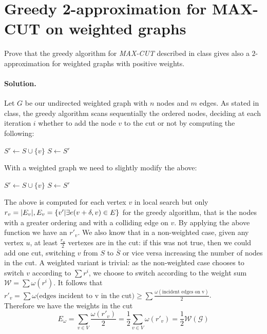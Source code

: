 \section{Greedy  2-approximation for  MAX-CUT  on  weighted  graphs}
Prove  that  the  greedy algorithm for \emph{MAX-CUT} described in class gives also a $2$-approximation for weighted graphs with positive weights.

\paragraph{Solution.}
Let $G$ be our undirected weighted graph with $n$ nodes and $m$ edges.
As stated in class, the greedy algorithm scans sequentially the ordered nodes, deciding at each iteration $i$ whether to add the node $v$ to the cut or not by computing the following:
	\begin{algorithmic}[1]
	\State $S' \gets S \cup \{v\}$\;
		\State $S \gets S'$\;
	\EndIf
	\EndFunction
	\end{algorithmic}
With a weighted graph we need to slightly modify the above:
	\begin{algorithmic}[1]
	\State $S' \gets S \cup \{v\}$\;
	\State $S \gets S'$\;
	\EndIf
	\EndFunction
\end{algorithmic}
The above is computed for each vertex $v$ in local search but only $r_v = \lvert E_v\rvert, E_v = \{v' | \exists e(v + \delta, v) \in E\}$ for the greedy algorithm, that is the nodes with a greater ordering and with a colliding edge on $v$.
By applying the above function we have an $r'_v$.
We also know that in a non-weighted case, given any vertex $u$, at least $\frac{r_u}{2}$ vertexes are in the cut: if this was not true, then we could add one cut, switching $v$ from $S$ to $\bar{S}$ or vice versa increasing the number of nodes in the cut.
A weighted variant is trivial: as the non-weighted case chooses to switch $v$ according to $\sum{r^i}$, we choose to switch according to the weight sum $\mathcal{W} = \sum{\omega(r^i)}$.
It follows that $r'_v = \sum{\omega(\text{edges incident to v in the cut}}) \geq \sum{\frac{\omega \left( \text{incident edges on v} \right)}{2}}$. \\
Therefore we have the weights in the cut
\begin{equation}
E_{\omega} = \sum_{v \in V}{\frac{\omega(r'_v)}{2}} =
\frac{1}{2} \sum_{v \in V}{\omega(r'_v)} =
\frac{1}{2} \mathcal{W(G)}
\end{equation}